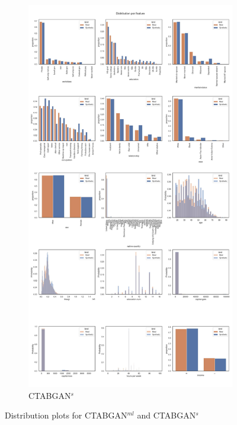 \begin{landscape}
\begin{figure}[h]
		\hfill
		\begin{subfigure}{0.45\linewidth}
			\includegraphics[height=\textheight,width=\linewidth,keepaspectratio]{images/distributions_full/ctabgan_simTune.jpg}
			\caption{CTABGAN$^s$}
		\end{subfigure}	
		\hfill
		\caption[Distribution plots CTABGAN Models]{Distribution plots for CTABGAN$^{ml}$ and CTABGAN$^s$}
		\label{fig_a:dist_1}
	\end{figure}
\end{landscape}
